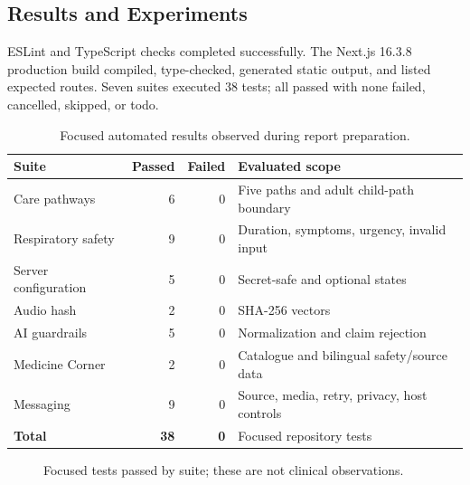 \documentclass[12pt,onecolumn]{IEEEtran}
\begin{document}
\subsection{Results and Experiments}
ESLint and TypeScript checks completed successfully. The Next.js 16.3.8 production build compiled, type-checked, generated static output, and listed expected routes. Seven suites executed 38 tests; all passed with none failed, cancelled, skipped, or todo.

\begin{table}[H]
\caption{Focused automated results observed during report preparation.}\label{tab:tests}\centering\small
\begin{tabularx}{\textwidth}{X r r X}
\toprule Suite & Passed & Failed & Evaluated scope \\\midrule
Care pathways & 6 & 0 & Five paths and adult child-path boundary \\
Respiratory safety & 9 & 0 & Duration, symptoms, urgency, invalid input \\
Server configuration & 5 & 0 & Secret-safe and optional states \\
Audio hash & 2 & 0 & SHA-256 vectors \\
AI guardrails & 5 & 0 & Normalization and claim rejection \\
Medicine Corner & 2 & 0 & Catalogue and bilingual safety/source data \\
Messaging & 9 & 0 & Source, media, retry, privacy, host controls \\
\midrule\textbf{Total} & \textbf{38} & \textbf{0} & Focused repository tests \\
\bottomrule
\end{tabularx}
\end{table}

\begin{figure}[H]
\centering
{}
\caption{Focused tests passed by suite; these are not clinical observations.}\label{fig:testbars}
\end{figure}
\end{document}

